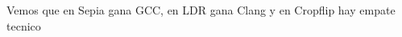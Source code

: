 \begin{figure}[H]
    \centering
    \begin{floatrow}
    \end{floatrow}
\end{figure}

Vemos que en Sepia gana GCC, en LDR gana Clang y en Cropflip hay empate tecnico



